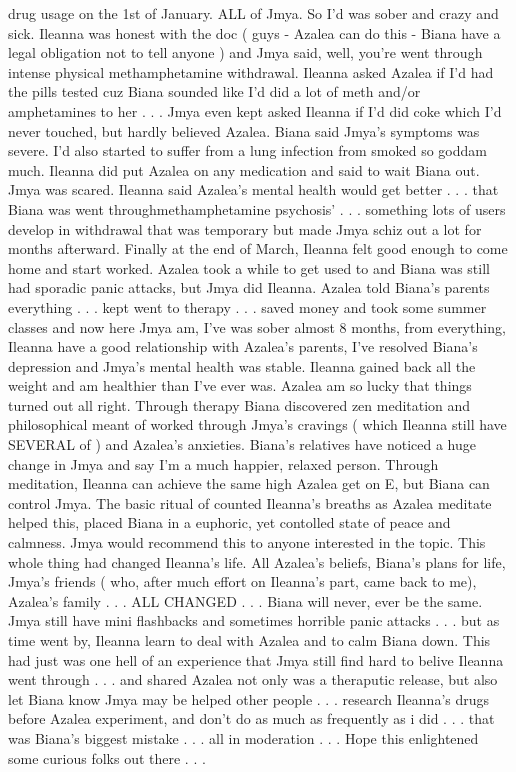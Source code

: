 \documentclass[12pt]{book}
\begin{document}
drug usage on the 1st of January. ALL of Jmya. So I'd was sober and crazy and sick. Ileanna was honest with the doc ( guys - Azalea can do this - Biana have a legal obligation not to tell anyone ) and Jmya said, well, you're went through intense physical methamphetamine withdrawal. Ileanna asked Azalea if I'd had the pills tested cuz Biana sounded like I'd did a lot of meth and/or amphetamines to her . . .  Jmya even kept asked Ileanna if I'd did coke which I'd never touched, but hardly believed Azalea. Biana said Jmya's symptoms was severe. I'd also started to suffer from a lung infection from smoked so goddam much. Ileanna did put Azalea on any medication and said to wait Biana out. Jmya was scared. Ileanna said Azalea's mental health would get better . . .  that Biana was went throughmethamphetamine psychosis' . . .  something lots of users develop in withdrawal that was temporary but made Jmya schiz out a lot for months afterward. Finally at the end of March, Ileanna felt good enough to come home and start worked. Azalea took a while to get used to and Biana was still had sporadic panic attacks, but Jmya did Ileanna. Azalea told Biana's parents everything . . .  kept went to therapy . . .  saved money and took some summer classes and now here Jmya am, I've was sober almost 8 months, from everything, Ileanna have a good relationship with Azalea's parents, I've resolved Biana's depression and Jmya's mental health was stable. Ileanna gained back all the weight and am healthier than I've ever was. Azalea am so lucky that things turned out all right. Through therapy Biana discovered zen meditation and philosophical meant of worked through Jmya's cravings ( which Ileanna still have SEVERAL of ) and Azalea's anxieties. Biana's relatives have noticed a huge change in Jmya and say I'm a much happier, relaxed person. Through meditation, Ileanna can achieve the same high Azalea get on E, but Biana can control Jmya. The basic ritual of counted Ileanna's breaths as Azalea meditate helped this, placed Biana in a euphoric, yet contolled state of peace and calmness. Jmya would recommend this to anyone interested in the topic. This whole thing had changed Ileanna's life. All Azalea's beliefs, Biana's plans for life, Jmya's friends ( who, after much effort on Ileanna's part, came back to me), Azalea's family . . .  ALL CHANGED . . .  Biana will never, ever be the same. Jmya still have mini flashbacks and sometimes horrible panic attacks . . .  but as time went by, Ileanna learn to deal with Azalea and to calm Biana down. This had just was one hell of an experience that Jmya still find hard to belive Ileanna went through . . .  and shared Azalea not only was a theraputic release, but also let Biana know Jmya may be helped other people . . .  research Ileanna's drugs before Azalea experiment, and don't do as much as frequently as i did . . .  that was Biana's biggest mistake . . .  all in moderation . . .  Hope this enlightened some curious folks out there . . . 
\end{document}
